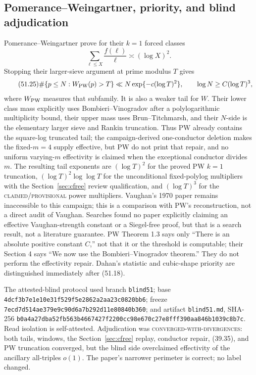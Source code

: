 \documentclass[10pt,reqno]{amsart}
\theoremstyle{definition}
\newcommand{\1}{\mathbf 1}
\begin{document}
\subsection{Pomerance--Weingartner, priority, and blind adjudication}
Pomerance--Weingartner \cite[\S4]{PomeranceWeingartner} prove for their
$k=1$ forced classes
\begin{equation}\tag{51.24}
                  \sum_{\ell\leq X}\frac{f(\ell)}\ell
                  \asymp(\log X)^2.
\end{equation}
Stopping their larger-sieve argument at prime modulus $T$ gives
\begin{equation}\tag{51.25}
 \#\{p\leq N:W_{\rm PW}(p)>T\}
 \ll N\exp\{-c(\log T)^2\},\qquad
 \log N\geq C(\log T)^3,
\end{equation}
where $W_{\rm PW}$ measures that subfamily.  It is also a weaker tail for
$W$.  Their lower class mass explicitly uses Bombieri--Vinogradov after a
polylogarithmic multiplicity bound, their upper mass uses
Brun--Titchmarsh, and their $N$-side is the elementary larger sieve and
Rankin truncation.  Thus PW already contains the square-log truncated tail;
the campaign-derived one-conductor deletion makes the fixed-$m=4$ supply
effective, but PW do not print that repair, and no uniform varying-$m$
effectivity is claimed when the exceptional conductor divides $m$.
The resulting tail exponents are $(\log T)^2$ for the proved PW $k=1$
truncation, $(\log T)^2\log\log T$ for the unconditional fixed-polylog
multipliers with the Section~\ref{sec:cfree} review qualification, and
$(\log T)^3$ for the \textsc{claimed/provisional} power multipliers.
Vaughan's 1970 paper remains inaccessible to this campaign; this is a
comparison with PW's reconstruction, not a direct audit of Vaughan.
Searches found no paper explicitly claiming an effective Vaughan-strength
constant or a Siegel-free proof, but that is a search result, not a
literature guarantee.  PW Theorem 1.3 says only ``There is an absolute
positive constant $C$,'' not that it or the threshold is computable; their
Section 4 says ``We now use the Bombieri--Vinogradov theorem.''  They do not
perform the effectivity repair.
Dahan's statistic and cubic-shape priority are distinguished immediately
after (51.18).

The attested-blind protocol used branch \texttt{blind51}; base
\texttt{4dcf3b7e}\allowbreak\texttt{1e10e31f}\allowbreak\texttt{529f5e28}\allowbreak\texttt{62a2aa23}\allowbreak\texttt{c0820bb6}; freeze
\texttt{7ecd7d51}\allowbreak\texttt{4ae379e9}\allowbreak\texttt{c90d6a7b}\allowbreak\texttt{292d11e8}\allowbreak\texttt{0840b360}; and artifact
\texttt{blind51.md}, SHA-256
\texttt{b0a4a27d}\allowbreak\texttt{ba52fb56}\allowbreak\texttt{3b466742}\allowbreak\texttt{7f2200cc}\allowbreak\texttt{98e670c2}\allowbreak\texttt{7e8fff39}\allowbreak\texttt{0aa846b1}\allowbreak\texttt{039c8b7c}.
Read isolation is self-attested.  Adjudication was
\textsc{converged-with-divergences}: both tails, windows, the
Section~\ref{sec:cfree} replay, conductor repair, (39.35), and PW truncation
converged, but the blind side overclaimed effectivity of the ancillary
all-triples $o(1)$.  The paper's narrower perimeter is correct; no label
changed.
\end{document}
